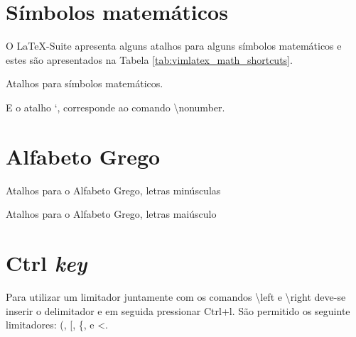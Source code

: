 \section{Símbolos matemáticos}
O LaTeX-Suite apresenta alguns atalhos para alguns símbolos matemáticos e estes são apresentados na Tabela \ref{tab:vimlatex_math_shortcuts}.
\begin{table}[h!tb]
    \centering
    \caption{Atalhos para símbolos matemáticos.}
    \label{tab:vimlatex_math_shortcuts}
    
\end{table}

E o atalho `, corresponde ao comando \textbackslash\textsf{nonumber}.


\section{Alfabeto Grego}

\begin{table}[h!tb]
    \centering
    \caption{Atalhos para o Alfabeto Grego, letras minúsculas}
    \label{tab:vimlatex_greek_shortcuts}
    
\end{table}

\begin{table}[h!tb]
    \centering
    \caption{Atalhos para o Alfabeto Grego, letras maiúsculo}
    \label{tab:vimlatex_greek_capital_shortcuts}
    
\end{table}

\section{\textsf{Ctrl} \textit{key}}
Para utilizar um limitador juntamente com os comandos \textbackslash\textsf{left} e \textbackslash\textsf{right} deve-se inserir o delimitador e em seguida pressionar \textsf{Ctrl}+\textsf{l}. São permitido os seguinte limitadores: (, [, \{, \textbar e \textless.

